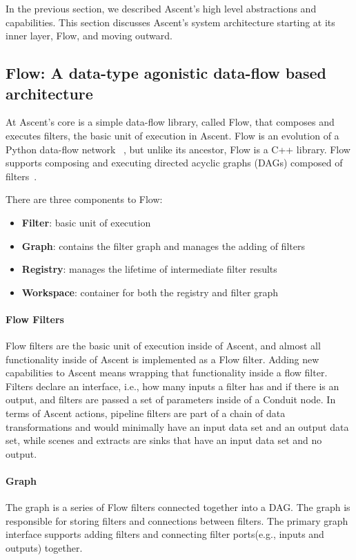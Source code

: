 In the previous section, we described Ascent's high level abstractions and
capabilities.
%
This section discusses Ascent's system architecture starting at its inner layer, Flow,
and moving outward.

\subsection{Flow: A data-type agonistic data-flow based architecture}
At Ascent's core is a simple data-flow library, called Flow, that
composes and executes filters, the basic unit of execution in Ascent.
%
Flow is an evolution of a Python data-flow network
~\cite{flow_reference}, but unlike its ancestor, Flow is a C++
library.
%
Flow supports composing and executing directed acyclic graphs
(DAGs) composed of filters~\cite{LarsenAscent}.

There are three components to Flow:
\begin{itemize}
  \item \textbf{Filter}: basic unit of execution
  \item \textbf{Graph}: contains the filter graph and manages the adding of filters
  \item \textbf{Registry}: manages the lifetime of intermediate filter results
  \item \textbf{Workspace}: container for both the registry and filter graph
\end{itemize}

\paragraph{Flow Filters}
Flow filters are the basic unit of execution inside of Ascent, and
almost all functionality inside of Ascent is implemented as a Flow filter.
%
Adding new capabilities to Ascent means wrapping that functionality inside
a flow filter.
%
Filters declare an interface, i.e., how many inputs a filter has and
if there is an output, and filters are passed a set of parameters inside
of a Conduit
node.
%
In terms of Ascent actions, pipeline filters are part of a chain of
data transformations and would minimally have an input
data set and an output data set, while scenes and extracts
are sinks that have an input data set and no output.
%

\paragraph{Graph}
The graph is a series of Flow filters connected together into
a DAG.
%
The graph is responsible for storing filters and connections
between filters.
%
The primary graph interface supports adding filters and connecting
filter ports(e.g., inputs and outputs) together.

